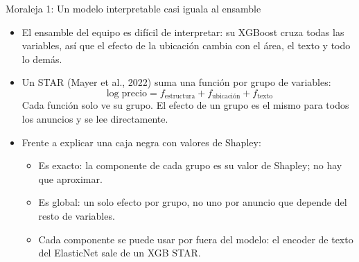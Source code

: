 \documentclass[aspectratio=169, 11pt]{beamer}
\begin{document}
\begin{frame}{Moraleja 1: Un modelo interpretable casi iguala al ensamble}
  \small
  \begin{itemize}\setlength{\itemsep}{9pt}
    \item El ensamble del equipo es difícil de interpretar: su XGBoost cruza todas las variables, así que el efecto de la ubicación cambia con el área, el texto y todo lo demás.
    \item Un STAR (Mayer et al., 2022) suma una función por grupo de variables:
      \[ \log \text{precio} = f_{\text{estructura}} + f_{\text{ubicación}} + f_{\text{texto}} \]
      Cada función solo ve su grupo. El efecto de un grupo es el mismo para todos los anuncios y se lee directamente.
    \item Frente a explicar una caja negra con valores de Shapley:
    \begin{itemize}\footnotesize\setlength{\itemsep}{3pt}
      \item Es exacto: la componente de cada grupo es su valor de Shapley; no hay que aproximar.
      \item Es global: un solo efecto por grupo, no uno por anuncio que depende del resto de variables.
      \item Cada componente se puede usar por fuera del modelo: el encoder de texto del ElasticNet sale de un XGB STAR.
    \end{itemize}
  \end{itemize}
\end{frame}
\end{document}
